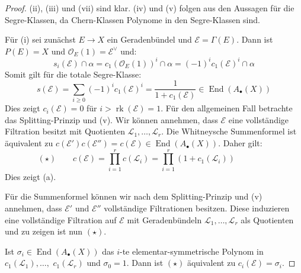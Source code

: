 \documentclass[10pt,b5paper]{article}
\begin{document}
\begin{proof}
(ii), (iii) und (vii) sind klar. (iv) und (v) folgen aus den Aussagen für die Segre-Klassen, da Chern-Klassen Polynome in den Segre-Klassen sind.

Für (i) sei zunächst $E\to X$ ein Geradenbündel und $\mathcal{E} = \Gamma(E)$. Dann ist $P(E)=X$ und $\mathcal{O}_E(1)=\mathcal{E}^\vee$ und:
\[ s_i(\mathcal{E})\cap\alpha = c_1(\mathcal{O}_E(1))^i\cap\alpha = (-1)^ic_1(\mathcal{E})^i\cap\alpha \]
Somit gilt für die totale Segre-Klasse:
\[ s(\mathcal{E}) = \sum_{i\geq 0}(-1)^ic_1(\mathcal{E})^i = \frac{1}{1+c_1(\mathcal{E})}\in\operatorname{End}(A_\bullet(X)) \]
Dies zeigt $c_i(\mathcal{E}) = 0$ für $i> \operatorname{rk}(\mathcal{E}) = 1$. Für den allgemeinen Fall betrachte das Splitting-Prinzip und (v). Wir können annehmen, dass $\mathcal{E}$ eine vollständige Filtration besitzt mit Quotienten $\mathcal{L}_1,\ldots,\mathcal{L}_r$. Die Whitneysche Summenformel ist äquivalent zu $c(\mathcal{E}')c(\mathcal{E}'') = c(\mathcal{E})\in\operatorname{End}(A_\bullet(X))$. Daher gilt:
\[ (\star) \qquad c(\mathcal{E}) = \prod_{i=1}^r c(\mathcal{L}_i) = \prod_{i=1}^r(1+c_1(\mathcal{L}_i)) \phantom{\qquad(\star)} \]
Dies zeigt (a).

Für die Summenformel können wir nach dem Splitting-Prinzip und (v) annehmen, dass $\mathcal{E}'$ und $\mathcal{E}''$ vollständige Filtrationen besitzen. Diese induzieren eine vollständige Filtration auf $\mathcal{E}$ mit Geradenbündeln $\mathcal{L}_1,\ldots,\mathcal{L}_r$ als Quotienten und zu zeigen ist nun $(\star)$.

Ist $\sigma_i\in\operatorname{End}(A_\bullet(X))$ das $i$-te elementar-symmetrische Polynom in $c_1(\mathcal{L}_1),\ldots,$ $c_1(\mathcal{L}_r)$ und $\sigma_0 =1$. Dann ist $(\star)$ äquivalent zu $c_i(\mathcal{E}) = \sigma_i$. 


\end{proof}
\end{document}
